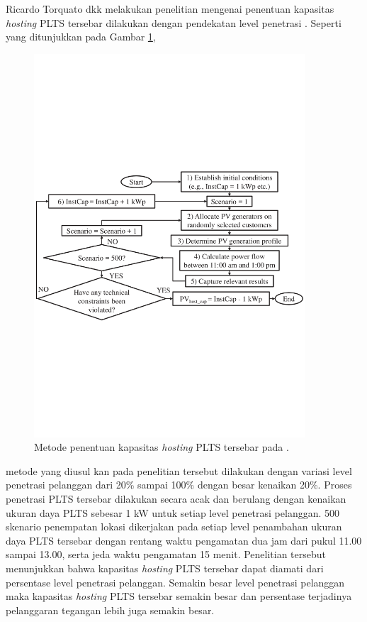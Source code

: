 {{{Ricardo Torquato dkk melakukan penelitian mengenai penentuan kapasitas \textit{hosting} PLTS tersebar dilakukan dengan pendekatan level penetrasi \cite{Torquato2018}.  Seperti yang ditunjukkan pada Gambar \ref{methodtorquato},
\begin{figure}[!h]
	\centering
	\includegraphics[width=0.9\textwidth]{Fig/methodtorquato}
	\caption{Metode penentuan kapasitas \textit{hosting} PLTS tersebar pada \cite{Torquato2018}.}
	\label{methodtorquato}
\end{figure}
metode yang diusul kan pada penelitian tersebut dilakukan dengan variasi level penetrasi pelanggan dari 20\% sampai 100\% dengan besar kenaikan 20\%. Proses penetrasi PLTS tersebar dilakukan secara acak dan berulang dengan kenaikan ukuran daya PLTS sebesar 1 kW untuk setiap level penetrasi pelanggan. 500 skenario penempatan lokasi dikerjakan pada setiap level penambahan ukuran daya PLTS tersebar dengan rentang waktu pengamatan dua jam dari pukul 11.00 sampai 13.00, serta jeda waktu pengamatan 15 menit. Penelitian tersebut menunjukkan bahwa kapasitas \textit{hosting} PLTS tersebar dapat diamati dari persentase level penetrasi pelanggan. Semakin besar level penetrasi pelanggan maka kapasitas \textit{hosting} PLTS tersebar semakin besar dan persentase terjadinya pelanggaran tegangan lebih juga semakin besar.

}}}
